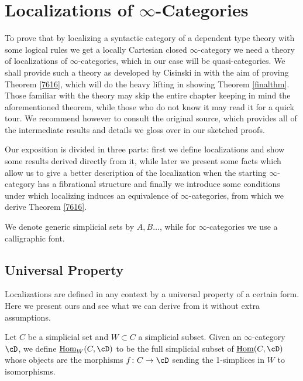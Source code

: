 \chapter{Localizations of \texorpdfstring{$\infty$}{∞}-Categories}
\label{chapter3}

To prove that by localizing a syntactic category of a dependent type theory with
some logical rules we get a locally
Cartesian closed $\infty$-category we need a theory of localizations
of $\infty$-categories, which in our case will be quasi-categories. We shall
provide such a theory as
developed by Cisinski in \cite[Ch.\ 7]{Cis19} with the aim of
proving Theorem \ref{7616}, which will do the heavy lifting in showing
Theorem \ref{finalthm}. Those familiar with the theory may skip the entire chapter
keeping in mind the aforementioned theorem, while those who do not know it may
read it for a quick tour. We recommend however to consult the original source,
which provides all of the intermediate results and details we gloss over in our
sketched proofs.

\noindent
Our exposition is divided in three parts: first we define localizations and show
some results derived directly from it, while later we present some facts which
allow us to give a better description of the localization when the starting
$\infty$-category has a fibrational structure and finally we introduce some
conditions under which localizing induces an equivalence of $\infty$-categories,
from which we derive Theorem \ref{7616}.

\begin{notation}
  We denote generic simplicial sets by $A,B\ldots$, while for
  $\infty$-categories we use a calligraphic font.
\end{notation}

\section{Universal Property}

Localizations are defined in any context by a universal property of a certain
form. Here we present ours and see what we can derive from it without extra
assumptions.

\begin{defn}
  Let $C$ be a simplicial set and $W\subset C$ a simplicial subset. Given an
  $\infty$-category $\cD$, we define $\home_W(C,\cD)$ to be the full simplicial
  subset of $\home(C,\cD)$ whose objects are the morphisms $f\colon
  C\rightarrow\cD$ sending the 1-simplices in $W$ to isomorphisms.
\end{defn}

